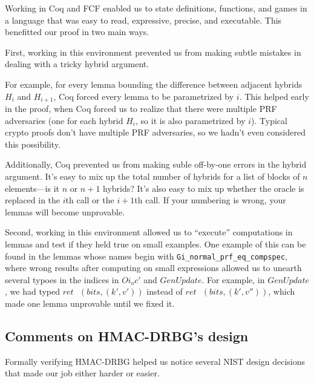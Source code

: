 \documentclass[12pt,lot, lof]{puthesis}
\newcommand{\s} {\textrm{ }}
\newcommand{\li} {\lstinline}
\begin{document}
{Working in Coq and FCF enabled us to state definitions, functions, and games in a language that was easy to read, expressive, precise, and executable. This benefitted our proof in two main ways. 

First, working in this environment prevented us from making subtle mistakes in dealing with a tricky hybrid argument.

For example, for every lemma bounding the difference between adjacent hybrids $H_i$ and $H_{i+1}$, Coq forced every lemma to be parametrized by $i$. This helped early in the proof, when Coq forced us to realize that there were multiple PRF adversaries (one for each hybrid $H_i$, so it is also parametrized by $i$). Typical crypto proofs don't have multiple PRF adversaries, so we hadn't even considered this possibility.

Additionally, Coq prevented us from making suble off-by-one errors in the hybrid argument. It's easy to mix up the total number of hybrids for a list of blocks of $n$ elements---is it $n$ or $n+1$ hybrids? It's also easy to mix up whether the oracle is replaced in the $i$th call or the $i+1$th call. If your numbering is wrong, your lemmas will become unprovable.


Second, working in this environment allowed us to ``execute'' computations in lemmas and test if they held true on small examples. One example of this can be found in the lemmas whose names begin with \li|Gi_normal_prf_eq_compspec|, where wrong results after computing on small expressions allowed us to unearth several typoes in the indices in $Oi_oc'$ and $GenUpdate$. For example, in $GenUpdate$, we had typed $ret \s (bits, (k', v'))$ instead of $ret \s (bits, (k', v''))$, which made one lemma unprovable until we fixed it.

\subsection{Comments on HMAC-DRBG's design}

Formally verifying HMAC-DRBG helped us notice several NIST design decisions that made our job either harder or easier.

}
\end{document}
